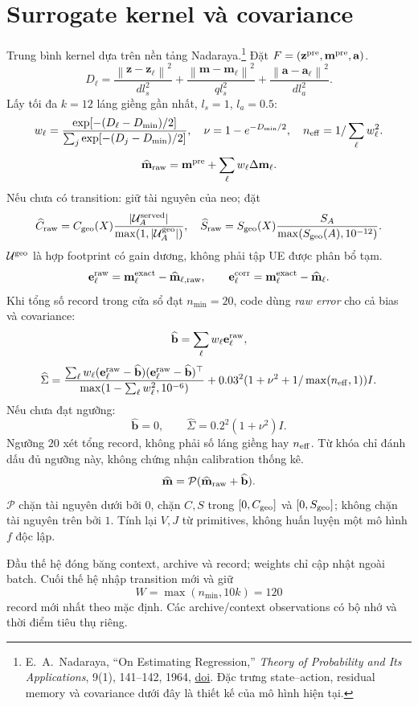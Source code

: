 \documentclass[11pt,a4paper]{article}
\newcommand{\norm}[1]{\left\lVert#1\right\rVert}
\newcommand{\code}[1]{\texttt{\detokenize{#1}}}
\begin{document}
\section{Surrogate kernel và covariance}
Trung bình kernel dựa trên nền tảng Nadaraya.\footnote{E.~A.~Nadaraya, ``On Estimating Regression,'' \emph{Theory of Probability and Its Applications}, 9(1), 141--142, 1964, \href{https://doi.org/10.1137/1109020}{doi}. Đặc trưng state--action, residual memory và covariance dưới đây là thiết kế của mô hình hiện tại.}
Đặt $F=(\mathbf z^{\rm pre},\mathbf m^{\rm pre},\mathbf a)$.
\[
D_\ell=\frac{\norm{\mathbf z-\mathbf z_\ell}^2}{d l_s^2}
+\frac{\norm{\mathbf m-\mathbf m_\ell}^2}{q l_s^2}
+\frac{\norm{\mathbf a-\mathbf a_\ell}^2}{d l_a^2}.
\]
Lấy tối đa $k=12$ láng giềng gần nhất, $l_s=1$, $l_a=0.5$:
\[
w_\ell=\frac{\exp[-(D_\ell-D_{\min})/2]}{\sum_j\exp[-(D_j-D_{\min})/2]},\quad
\nu=1-e^{-D_{\min}/2},\quad n_{\rm eff}=1/\sum_\ell w_\ell^2.
\]
\[
\widehat{\mathbf m}_{\rm raw}=\mathbf m^{\rm pre}+\sum_\ell w_\ell\Delta\mathbf m_\ell.
\]
Nếu chưa có transition: giữ tài nguyên của neo; đặt
\[
\widehat C_{\rm raw}=C_{\rm geo}(X)\frac{|\mathcal U_A^{\rm served}|}{\max(1,|\mathcal U_A^{\rm geo}|)},\quad
\widehat S_{\rm raw}=S_{\rm geo}(X)\frac{S_A}{\max(S_{\rm geo}(A),10^{-12})}.
\]
$\mathcal U^{\rm geo}$ là hợp footprint có gain dương, không phải tập UE được phân bổ tạm.
\[
\mathbf e_\ell^{\rm raw}=\mathbf m_\ell^{\rm exact}-\widehat{\mathbf m}_{\ell,\rm raw},\qquad
\mathbf e_\ell^{\rm corr}=\mathbf m_\ell^{\rm exact}-\widehat{\mathbf m}_{\ell}.
\]
Khi tổng số record trong cửa sổ đạt $n_{\min}=20$, code dùng \emph{raw error} cho cả bias và covariance:
\[
\widehat{\mathbf b}=\sum_\ell w_\ell\mathbf e_\ell^{\rm raw},
\]
\[
\widehat\Sigma=\frac{\sum_\ell w_\ell
(\mathbf e_\ell^{\rm raw}-\widehat{\mathbf b})
(\mathbf e_\ell^{\rm raw}-\widehat{\mathbf b})^\top}
{\max(1-\sum_\ell w_\ell^2,10^{-6})}
+0.03^2(1+\nu^2+1/\max(n_{\rm eff},1))I.
\]
Nếu chưa đạt ngưỡng:
\[
\widehat{\mathbf b}=0,\qquad\widehat\Sigma=0.2^2(1+\nu^2)I.
\]
Ngưỡng $20$ xét tổng record, không phải số láng giềng hay $n_{\rm eff}$. Từ khóa \code{calibrated} chỉ đánh dấu đủ ngưỡng này, không chứng nhận calibration thống kê.
\[
\widehat{\mathbf m}=\mathcal P(\widehat{\mathbf m}_{\rm raw}+\widehat{\mathbf b}).
\]
$\mathcal P$ chặn tài nguyên dưới bởi $0$, chặn $C,S$ trong $[0,C_{\rm geo}]$ và $[0,S_{\rm geo}]$; không chặn tài nguyên trên bởi $1$.
Tính lại $V,J$ từ primitives, không huấn luyện một mô hình $f$ độc lập.

Đầu thế hệ đóng băng context, archive và record; weights chỉ cập nhật ngoài batch. Cuối thế hệ nhập transition mới và giữ
\[
W=\max(n_{\min},10k)=120
\]
record mới nhất theo mặc định. Các archive/context observations có bộ nhớ và thời điểm tiêu thụ riêng.
\end{document}
